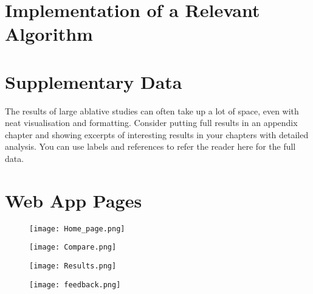 \chapter{Implementation of a Relevant Algorithm}
\label{app:implementation_algorithm}




\chapter{Supplementary Data}
\label{app:supplementary_data}

The results of large ablative studies can often take up a lot of space, even with neat visualisation and formatting.
Consider putting full results in an appendix chapter and showing excerpts of interesting results in your chapters with detailed analysis.
You can use labels and references to refer the reader here for the full data.

\chapter{Web App Pages}
\label{app:web_designs}

\begin{figure}[h]
	\centering
	\texttt{[image: Home\_page.png]}
	\caption{}
	
		
	\end{figure} 
\begin{figure}[h]
	\centering
	\texttt{[image: Compare.png]}
	\caption{}
	
		
	\end{figure} 

\begin{figure}[h]
	\centering
	\texttt{[image: Results.png]}
	\caption{}
	
		
	\end{figure} 


		
\begin{figure}[h]
	\centering
	\texttt{[image: feedback.png]}
	\caption{}
		
	\end{figure} 

